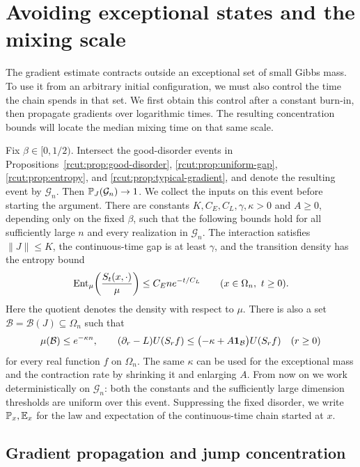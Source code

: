 \section{Avoiding exceptional states and the mixing scale}
\label{rcut:sec:dynamics}

The gradient estimate contracts outside an exceptional set of small
Gibbs mass.  To use it from an arbitrary initial configuration, we must
also control the time the chain spends in that set.  We first obtain
this control after a constant burn-in, then propagate gradients over
logarithmic times.  The resulting concentration bounds will locate the
median mixing time on that same scale.

Fix $\beta\in[0,1/2)$.  Intersect the
good-disorder events in Propositions~\ref{rcut:prop:good-disorder},
\ref{rcut:prop:uniform-gap}, \ref{rcut:prop:entropy}, and
\ref{rcut:prop:typical-gradient}, and denote the resulting event by
$\mathcal G_n$.  Then $\P_J(\mathcal G_n)\to1$.
We collect the inputs on this event before starting the argument.
There are constants $K,C_E,C_L,\gamma,\kappa>0$ and $A\ge0$, depending
only on the fixed $\beta$, such that the following bounds hold for all
sufficiently large $n$ and every realization in $\mathcal G_n$.
The interaction satisfies $\|J\|\le K$, the continuous-time gap is at
least $\gamma$, and the transition density has the entropy bound
\begin{equation}
 \Ent_\mu\!\left(\frac{S_t(x,\cdot)}{\mu}\right)
 \le C_E n e^{-t/C_L}
 \qquad(x\in\Omega_n,\ t\ge0).
 \label{rcut:eq:dyn-entropy-input}
\end{equation}
Here the quotient denotes the density with respect to $\mu$.
There is also a set $\mathcal B=\mathcal B(J)\subseteq\Omega_n$ such that
\begin{equation}
 \mu(\mathcal B)\le e^{-\kappa n},\qquad
 (\partial_r-L)U(S_r f)
 \le \bigl(-\kappa+A\1_{\mathcal B}\bigr)U(S_r f)
 \quad(r\ge0)
 \label{rcut:eq:dyn-gradient-input}
\end{equation}
for every real function $f$ on $\Omega_n$.  The same $\kappa$ can be
used for the exceptional mass and the contraction rate by shrinking it
and enlarging $A$.  From now on we work deterministically on
$\mathcal G_n$: both the constants and the sufficiently large dimension
thresholds are uniform over this event.  Suppressing the fixed disorder,
we write $\P_x,\E_x$ for the law and expectation of the continuous-time
chain started at $x$.

\subsection{Gradient propagation and jump concentration}

